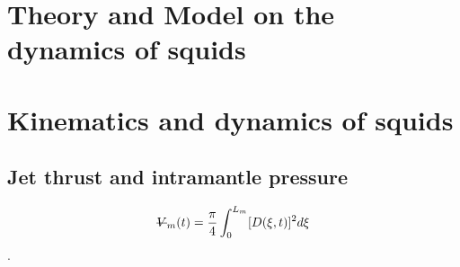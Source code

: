 \documentclass[main.tex]{subfiles}
\begin{document}
\section{Theory and Model on the dynamics of squids}

\lipsum[1-2]

\section{Kinematics and dynamics of squids}

\lipsum[1-2]

\subsection{Jet thrust and intramantle pressure}

\lipsum[1-2]
\begin{equation}
    \text{\sout{$V$}}_m(t) = \frac{\pi}{4}\int_0^{L_m}[D(\xi,t)]^2d\xi
\end{equation}
\lipsum[1]\cite{Anderson2000}. 
\end{document}
